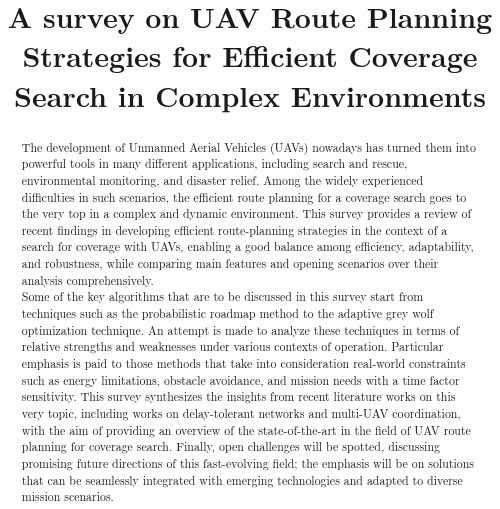 \documentclass[conference]{IEEEtran}
\begin{document}
\title{A survey on UAV Route Planning Strategies for Efficient Coverage Search in Complex Environments}

\author{


\and 


}

\maketitle

\begin{abstract}

The development of Unmanned Aerial Vehicles (UAVs) nowadays has turned them into powerful tools in many different applications, including search and rescue, environmental monitoring, and disaster relief. Among the widely experienced difficulties in such scenarios, the efficient route planning for a coverage search goes to the very top in a complex and dynamic environment. This survey provides a review of recent findings in developing efficient route-planning strategies in the context of a search for coverage with UAVs, enabling a good balance among efficiency, adaptability, and robustness, while comparing main features and opening scenarios over their analysis comprehensively.\\ 

Some of the key algorithms that are to be discussed in this survey start from techniques such as the probabilistic roadmap method to the adaptive grey wolf optimization technique. An attempt is made to analyze these techniques in terms of relative strengths and weaknesses under various contexts of operation. Particular emphasis is paid to those methods that take into consideration real-world constraints such as energy limitations, obstacle avoidance, and mission needs with a time factor sensitivity. This survey synthesizes the insights from recent literature works on this very topic, including works on delay-tolerant networks and multi-UAV coordination, with the aim of providing an overview of the state-of-the-art in the field of UAV route planning for coverage search. Finally, open challenges will be spotted, discussing promising future directions of this fast-evolving field; the emphasis will be on solutions that can be seamlessly integrated with emerging technologies and adapted to diverse mission scenarios.\\

\end{abstract}
\end{document}
